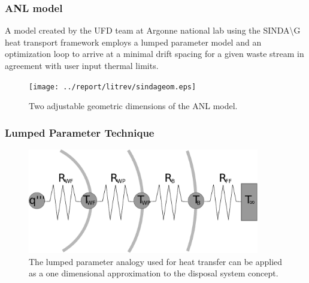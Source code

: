 
\begin{frame}
  \frametitle{ANL model}
  A model created by the UFD team at Argonne national lab using the 
  SINDA{\textbackslash}G heat transport framework employs a lumped parameter 
  model and an optimization loop to arrive at a minimal drift spacing for a 
  given waste stream in agreement with user input thermal limits. 
  \begin{figure}[h!]
    \begin{center}
      \texttt{[image: ../report/litrev/sindageom.eps]}
    \end{center}
    \caption{Two adjustable geometric dimensions of the ANL model.} 
    \label{fig:sindageom}
  \end{figure}
\end{frame}


\begin{frame}[ctb!]
  \frametitle{Lumped Parameter Technique}
  \begin{figure}[h!]
    \begin{center}
      \includegraphics[width=0.9\textwidth]{./images/lumpedParam.eps}
    \end{center}
    \caption{The lumped parameter analogy used for heat transfer can be applied 
    as a one dimensional approximation to the disposal system concept. }
    \label{fig:lumpedParam}
  \end{figure}
\end{frame}




